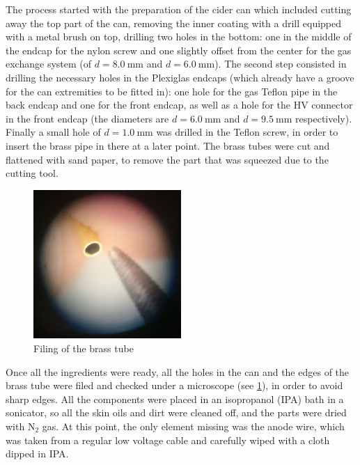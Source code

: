 The process started with the preparation of the cider can which included cutting
away the top part of the can, removing the inner coating with a drill equipped with a
metal brush on top, drilling two holes in the bottom: one in the middle of the
endcap for the nylon screw and one slightly offset from the center for the
gas exchange system (of $d = \SI{8.0}{\milli\meter}$ and $d =
\SI{6.0}{\milli\meter}$). The second step consisted in drilling the necessary
holes in the Plexiglas endcaps (which already have a groove for the can
extremities to be fitted in): one hole for the gas Teflon pipe in the back
endcap and one for the front endcap, as well as a hole for the HV connector in the
front endcap (the diameters are $d = \SI{6.0}{\milli\meter}$ and $d =
\SI{9.5}{\milli\meter}$ respectively). Finally a small hole of $d =
\SI{1.0}{\milli\meter}$ was drilled in the Teflon screw, in order to insert the
brass pipe in there at a later point. The brass tubes were cut and flattened
with sand paper, to remove the part that was squeezed due to the cutting tool.

\begin{figure}[htb!]
  \centering
  \includegraphics[width=0.5\textwidth]{./graphics/brass_file.jpg}
  \caption{Filing of the brass tube}
  \label{fig:brass_file}
\end{figure}


Once all the ingredients were ready, all the holes in the can and the edges of
the brass tube were filed and checked under a microscope (see \ref{fig:brass_file}), in order to avoid
sharp edges. All the components were placed in an isopropanol (IPA) bath in a
sonicator, so all the skin oils and dirt were cleaned off, and the parts were
dried with $\mathrm{N}_2$ gas. At this point, the only element missing was the
anode wire, which was taken from a regular low voltage cable and carefully wiped
with a cloth dipped in IPA.


